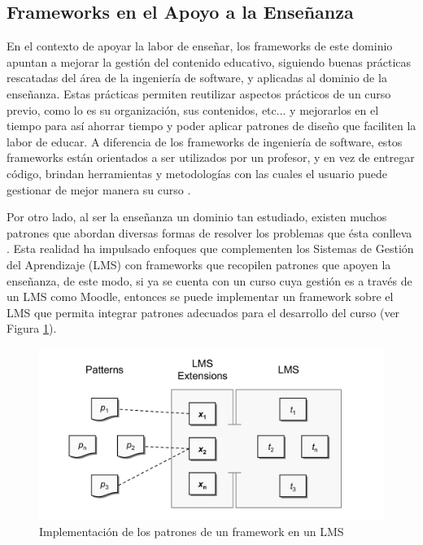 \documentclass[letterpaper,12pt]{article}
\begin{document}
\subsection{Frameworks en el Apoyo a la Enseñanza}

En el contexto de apoyar la labor de enseñar, los frameworks de este dominio apuntan a mejorar la gestión del contenido educativo, siguiendo buenas prácticas rescatadas del área de la ingeniería de software, y aplicadas al dominio de la enseñanza. Estas prácticas permiten reutilizar aspectos prácticos de un curso previo, como lo es su organización, sus contenidos, etc... y mejorarlos en el tiempo para así ahorrar tiempo y poder aplicar patrones de diseño que faciliten la labor de educar. A diferencia de los frameworks de ingeniería de software, estos frameworks están orientados a ser utilizados por un profesor, y en vez de entregar código, brindan herramientas y metodologías con las cuales el usuario puede gestionar de mejor manera su curso \cite{elearn}.

Por otro lado, al ser la enseñanza un dominio tan estudiado, existen muchos patrones que abordan diversas formas de resolver los problemas que ésta conlleva \cite{elearn}. Esta realidad ha impulsado enfoques que complementen los Sistemas de Gestión del Aprendizaje (LMS) con frameworks que recopilen patrones que apoyen la enseñanza, de este modo, si ya se cuenta con un curso cuya gestión es a través de un LMS como Moodle, entonces se puede implementar un framework sobre el LMS que permita integrar patrones adecuados para el desarrollo del curso (ver Figura \ref{patronlms}).

\begin{figure}[H]
  \centering
  \includegraphics[width=1\textwidth]{patronlms.png}
  \caption{Implementación de los patrones de un framework en un LMS \cite{elearn}}
  \label{patronlms}
\end{figure}
\end{document}
